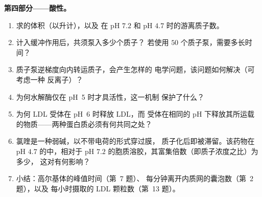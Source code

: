 \begin{problem}
\medskip
\noindent\textbf{第四部分——酸性。}
\begin{enumerate}[resume]
  \item 求的体积（以升计），以及
        在 pH $7.2$ 和 pH $4.7$ 时的游离质子数。
  \item 计入缓冲作用后，共须泵入多少个质子？
        若使用 $50$ 个质子泵，需要多长时间？
  \item 质子泵逆梯度向内转运质子，会产生怎样的
        电学问题，该问题如何解决（可考虑一种
        反离子）？
  \item 为何水解酶仅在 pH~5 时才具活性，这一机制
        保护了什么？
  \item 为何 LDL 受体在 pH~6 时释放 LDL，而
        受体在相同的
        pH 下释放其所运载的物质——两种蛋白质必须有何共同之处？
  \item 氯喹是一种弱碱，以不带电荷的形式穿过膜，
        质子化后即被滞留。该药物在
        pH $4.7$ 的中，相对于
        pH $7.2$ 的胞质溶胶，其富集倍数（即质子浓度之比）为多少，
        这对有何影响？
  \item 小结：高尔基体的峰值时间（第~7 题）、
        每分钟离开内质网的囊泡数（第~2 题），以及
        每小时摄取的 LDL 颗粒数（第~13 题）。
\end{enumerate}
\end{problem}
